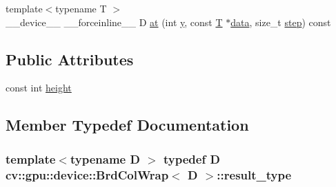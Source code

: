 \begin{DoxyCompactItemize}
\item 
{\footnotesize template$<$typename T $>$ }\\\-\_\-\-\_\-device\-\_\-\-\_\- \-\_\-\-\_\-forceinline\-\_\-\-\_\- D \hyperlink{structcv_1_1gpu_1_1device_1_1BrdColWrap_a086cebdfa783c82525a8c1e3e1b90132}{at} (int \hyperlink{highgui__c_8h_af1202c02b14870c18fb3a1da73e9e7c7}{y}, const \hyperlink{calib3d_8hpp_a3efb9551a871ddd0463079a808916717}{T} $\ast$\hyperlink{legacy_8hpp_ab9fe6c09e6d02865a953fffc12fe6ca0}{data}, size\-\_\-t \hyperlink{legacy_8hpp_abc16e65f240ed0c8f3e876e8732c0a33}{step}) const 
\end{DoxyCompactItemize}
\subsection*{Public Attributes}
\begin{DoxyCompactItemize}
\item 
const int \hyperlink{structcv_1_1gpu_1_1device_1_1BrdColWrap_aef413433cca7a32f3aabe8aa1b578b84}{height}
\end{DoxyCompactItemize}


\subsection{Member Typedef Documentation}
\hypertarget{structcv_1_1gpu_1_1device_1_1BrdColWrap_a6e992e1e3cef29706e456b1aca726dc9}{
\subsubsection[{result\-\_\-type}]{\setlength{\rightskip}{0pt plus 5cm}template$<$typename D $>$ typedef D {\bf cv\-::gpu\-::device\-::\-Brd\-Col\-Wrap}$<$ D $>$\-::{\bf result\-\_\-type}}}\label{structcv_1_1gpu_1_1device_1_1BrdColWrap_a6e992e1e3cef29706e456b1aca726dc9}


